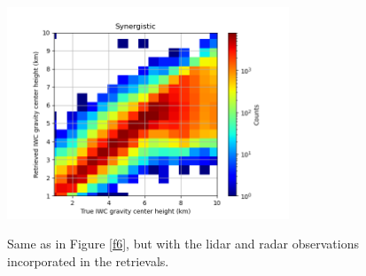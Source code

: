 \documentclass{ametsocV6.1}
\begin{document}
\begin{figure}[t]
    \centering
    \includegraphics[width=0.75\textwidth,angle=0]{./Figs/fig10.rev.png}\\
    \caption{Same as in Figure \ref{f6}, but with the lidar and radar observations incorporated in the
    retrievals.}\label{f10}
\end{figure}
\end{document}
